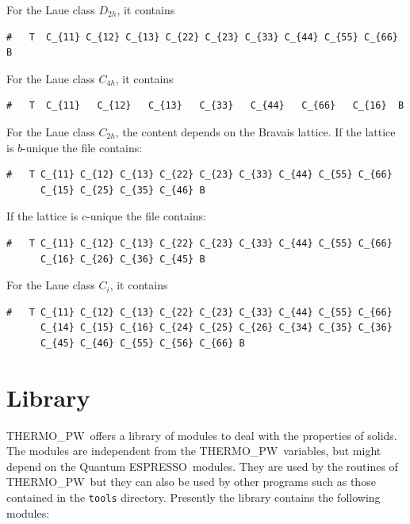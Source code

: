 \documentclass[12pt,a4paper]{article}
\def\qe{{\sc Quantum ESPRESSO}}
\def\tpw{{\sc THERMO\_PW}}
\begin{document}
\begin{itemize}
For the Laue class $D_{2h}$, it contains
\begin{verbatim}
#   T  C_{11} C_{12} C_{13} C_{22} C_{23} C_{33} C_{44} C_{55} C_{66} B
\end{verbatim}
For the Laue class $C_{4h}$, it contains
\begin{verbatim}
#   T  C_{11}   C_{12}   C_{13}   C_{33}   C_{44}   C_{66}   C_{16}  B
\end{verbatim}
For the Laue class $C_{2h}$, the content depends on the Bravais lattice. 
If the lattice is $b$-unique the file contains:
\begin{verbatim}
#   T C_{11} C_{12} C_{13} C_{22} C_{23} C_{33} C_{44} C_{55} C_{66} 
      C_{15} C_{25} C_{35} C_{46} B
\end{verbatim}
If the lattice is $c$-unique the file contains:
\begin{verbatim}
#   T C_{11} C_{12} C_{13} C_{22} C_{23} C_{33} C_{44} C_{55} C_{66} 
      C_{16} C_{26} C_{36} C_{45} B
\end{verbatim}
For the Laue class $C_i$, it contains
\begin{verbatim}
#   T C_{11} C_{12} C_{13} C_{22} C_{23} C_{33} C_{44} C_{55} C_{66} 
      C_{14} C_{15} C_{16} C_{24} C_{25} C_{26} C_{34} C_{35} C_{36}
      C_{45} C_{46} C_{55} C_{56} C_{66} B
\end{verbatim}

\end{itemize}

\newpage
\section{\color{coral}Library}

\tpw\ offers a library of modules to deal with the properties of solids. The 
modules are independent from the \tpw\ variables, but might
depend on the \qe\ modules. They are used by the routines of \tpw\ 
but they can also be used by other programs such as those contained
in the \texttt{tools} directory. Presently the library contains the
following modules:
\end{document}
